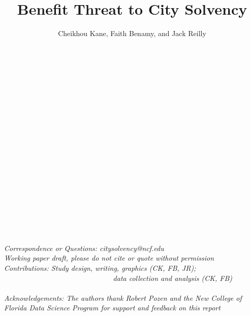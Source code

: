 \documentclass[12pt]{article}
\title{Benefit Threat to City Solvency}
\author{Cheikhou Kane, Faith Benamy, and Jack Reilly}
\affil{New College of Florida}
\newcommand\e{\emph}
\begin{document}
\begin{singlespace} 

\maketitle

~\\\\\\\\\\\\\\\\\\\\\\\\\\\\\\\\\

\begin{center}
 \e{Correspondence or Questions: citysolvency@ncf.edu} \\
 \e{Working paper draft, please do not cite or quote without permission}\\
 \e{Contributions: Study design, writing, graphics (CK, FB, JR); ~~~~~~~~~~~~~~~~~~~~~~~~~~~~~~data collection and analysis (CK, FB)}\\ ~\\
  \e{Acknowledgements: The authors thank Robert Pozen and the New College of Florida Data Science Program for support and feedback on this report}
\end{center}
\thispagestyle{empty} 

\end{singlespace} 

\clearpage
\end{document}
